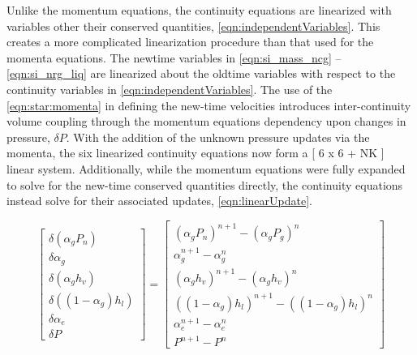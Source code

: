 Unlike the momentum equations, the continuity equations are linearized with variables other their conserved quantities, \eqref{eqn:independentVariables}.
This creates a more complicated linearization procedure than that used for the momenta equations.
The newtime variables in \eqref{eqn:si_mass_ncg} -- \eqref{eqn:si_nrg_liq}  are linearized about the oldtime variables with respect to the continuity variables in \eqref{eqn:independentVariables}.
The use of the \eqref{eqn:star:momenta} in defining the new-time velocities introduces inter-continuity volume coupling through the momentum equations dependency upon changes in pressure, $\delta P$.
With the addition of the unknown pressure updates via the momenta, the six linearized continuity equations now form a [ 6 x 6 + NK ] linear system.
Additionally, while the momentum equations were fully expanded to solve for the new-time conserved quantities directly, the continuity equations instead solve for their associated updates, \eqref{eqn:linearUpdate}.

\begin{equation}
\label{eqn:linearUpdate}
\begin{bmatrix}
\delta ( \alpha_{g} P_{n} ) \\
\delta \alpha_{g} \\
\delta ( \alpha_{g} h_v ) \\
\delta ( (1 - \alpha_{g} ) h_l ) \\
\delta \alpha_e \\
\delta P 
\end{bmatrix}
=
\begin{bmatrix}
( \alpha_{g} P_{n})^{n+1} - (\alpha_{g} P_{g} )^{n} \\
\alpha^{n+1}_{g} - \alpha^{n}_{g} \\
( \alpha_{g} h_{v} )^{n+1} - ( \alpha_{g} h_{v} )^{n} \\
( ( 1 - \alpha_{g} ) h_{l} )^{n+1} - ( ( 1 - \alpha_{g} ) h_{l} )^{n} \\
\alpha^{n+1}_{e} - \alpha^{n}_{e} \\
 P^{n+1} - P^{n}
\end{bmatrix}
\end{equation}

